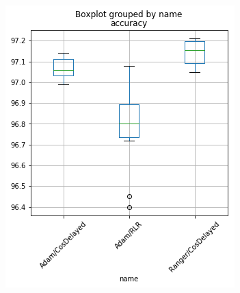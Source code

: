 \begin{figure}[ht]
    \hspace*{-0.05\linewidth}
    \begin{minipage}[c]{0.55\linewidth}
        \includegraphics[width=1\linewidth]{figures/chap3/entrainement/boxplot_accuracy_ranger.png}
    \end{minipage} \hfill
    \begin{minipage}[c]{0.55\linewidth}

\end{minipage}
\end{figure}
